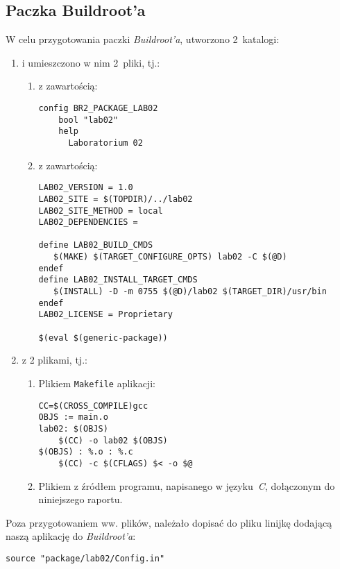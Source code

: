 \documentclass{article}
\begin{document}

\subsection{Paczka Buildroot'a}
\label{brpackage}

W celu przygotowania paczki \emph{Buildroot'a}, utworzono 2~katalogi:
\begin{enumerate}
\item {} i umieszczono w nim 2~pliki, tj.:
\begin{enumerate}
\item {} z zawartością:
\begin{Verbatim}[frame=single]
config BR2_PACKAGE_LAB02
	bool "lab02"
	help
	  Laboratorium 02
\end{Verbatim}
\item {} z zawartością:
\begin{Verbatim}[frame=single]
LAB02_VERSION = 1.0
LAB02_SITE = $(TOPDIR)/../lab02
LAB02_SITE_METHOD = local
LAB02_DEPENDENCIES = 

define LAB02_BUILD_CMDS
   $(MAKE) $(TARGET_CONFIGURE_OPTS) lab02 -C $(@D)
endef
define LAB02_INSTALL_TARGET_CMDS
   $(INSTALL) -D -m 0755 $(@D)/lab02 $(TARGET_DIR)/usr/bin
endef
LAB02_LICENSE = Proprietary

$(eval $(generic-package))
\end{Verbatim}
\end{enumerate}
\item {} z 2 plikami, tj.:
\begin{enumerate}
\item Plikiem \texttt{Makefile} aplikacji:
\begin{Verbatim}[frame=single]
CC=$(CROSS_COMPILE)gcc
OBJS := main.o
lab02: $(OBJS)
	$(CC) -o lab02 $(OBJS)
$(OBJS) : %.o : %.c
	$(CC) -c $(CFLAGS) $< -o $@
\end{Verbatim}
\item Plikiem  z źródłem programu, napisanego w języku~\emph{C}, dołączonym do niniejszego raportu.
\end{enumerate}
\end{enumerate}

Poza przygotowaniem ww. plików, należało dopisać do pliku  linijkę dodającą naszą aplikację do \emph{Buildroot'a}:
\begin{Verbatim}[frame=single]
source "package/lab02/Config.in"
\end{Verbatim}
\end{document}
